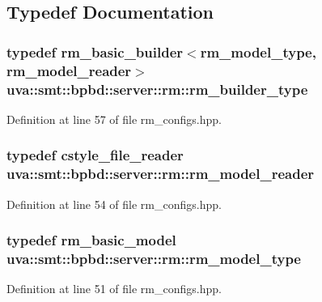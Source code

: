\subsection{Typedef Documentation}
\hypertarget{namespaceuva_1_1smt_1_1bpbd_1_1server_1_1rm_a7ffb9528c88aeafacbef2b862c461eb2}{}
\subsubsection[{rm\+\_\+builder\+\_\+type}]{\setlength{\rightskip}{0pt plus 5cm}typedef {\bf rm\+\_\+basic\+\_\+builder}$<${\bf rm\+\_\+model\+\_\+type}, {\bf rm\+\_\+model\+\_\+reader}$>$ {\bf uva\+::smt\+::bpbd\+::server\+::rm\+::rm\+\_\+builder\+\_\+type}}\label{namespaceuva_1_1smt_1_1bpbd_1_1server_1_1rm_a7ffb9528c88aeafacbef2b862c461eb2}


Definition at line 57 of file rm\+\_\+configs.\+hpp.

\hypertarget{namespaceuva_1_1smt_1_1bpbd_1_1server_1_1rm_a12b19feb109edabe0e0a960a258166a9}{}
\subsubsection[{rm\+\_\+model\+\_\+reader}]{\setlength{\rightskip}{0pt plus 5cm}typedef {\bf cstyle\+\_\+file\+\_\+reader} {\bf uva\+::smt\+::bpbd\+::server\+::rm\+::rm\+\_\+model\+\_\+reader}}\label{namespaceuva_1_1smt_1_1bpbd_1_1server_1_1rm_a12b19feb109edabe0e0a960a258166a9}


Definition at line 54 of file rm\+\_\+configs.\+hpp.

\hypertarget{namespaceuva_1_1smt_1_1bpbd_1_1server_1_1rm_a4d0c6c248c7451ba74697118cc6efa00}{}
\subsubsection[{rm\+\_\+model\+\_\+type}]{\setlength{\rightskip}{0pt plus 5cm}typedef {\bf rm\+\_\+basic\+\_\+model} {\bf uva\+::smt\+::bpbd\+::server\+::rm\+::rm\+\_\+model\+\_\+type}}\label{namespaceuva_1_1smt_1_1bpbd_1_1server_1_1rm_a4d0c6c248c7451ba74697118cc6efa00}


Definition at line 51 of file rm\+\_\+configs.\+hpp.

